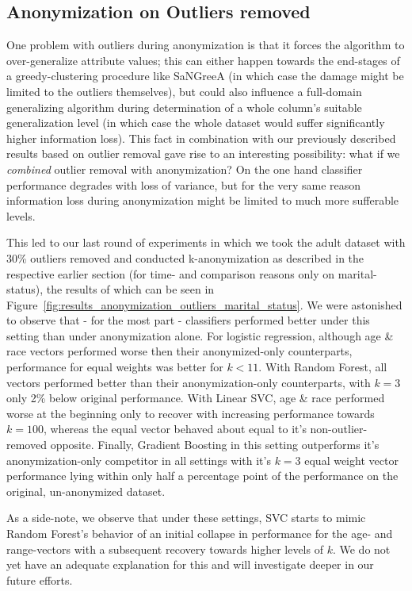 \documentclass{llncs}
\begin{document}
\subsection{Anonymization on Outliers removed}
\label{ssect:anon_outliers_removed}

One problem with outliers during anonymization is that it forces the algorithm to over-generalize attribute values; this can either happen towards the end-stages of a greedy-clustering procedure like SaNGreeA (in which case the damage might be limited to the outliers themselves), but could also influence a full-domain generalizing algorithm during determination of a whole column's suitable generalization level (in which case the whole dataset would suffer significantly higher information loss). This fact in combination with our previously described results based on outlier removal gave rise to an interesting possibility: what if we \textit{combined} outlier removal with anonymization? On the one hand classifier performance degrades with loss of variance, but for the very same reason information loss during anonymization might be limited to much more sufferable levels.

This led to our last round of experiments in which we took the adult dataset with 30\% outliers removed and conducted k-anonymization as described in the respective earlier section (for time- and comparison reasons only on marital-status), the results of which can be seen in Figure~\ref{fig:results_anonymization_outliers_marital_status}. We were astonished to observe that - for the most part - classifiers performed better under this setting than under anonymization alone. For logistic regression, although age \& race vectors performed worse then their anonymized-only counterparts, performance for equal weights was better for $k<11$. With Random Forest, all vectors performed better than their anonymization-only counterparts, with $k=3$ only 2\% below original performance. With Linear SVC, age \& race performed worse at the beginning only to recover with increasing performance towards $k=100$, whereas the equal vector behaved about equal to it's non-outlier-removed opposite. Finally, Gradient Boosting in this setting outperforms it's anonymization-only competitor in all settings with it's $k=3$ equal weight vector performance lying within only half a percentage point of the performance on the original, un-anonymized dataset.

As a side-note, we observe that under these settings, SVC starts to mimic Random Forest's behavior of an initial collapse in performance for the age- and range-vectors with a subsequent recovery towards higher levels of $k$. We do not yet have an adequate explanation for this and will investigate deeper in our future efforts. 
\end{document}
